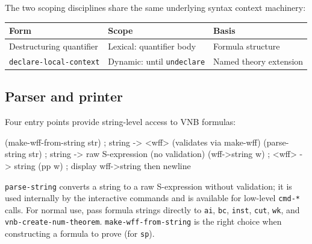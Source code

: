 \documentclass{amsbook}[openany]
\theoremstyle{definition}
\theoremstyle{remark}
\theoremstyle{remark}
\begin{document}
The two scoping disciplines share the same underlying syntax context
machinery:

\begin{center}
\begin{tabular}{lll}
\toprule
Form & Scope & Basis \\
\midrule
Destructuring quantifier &
  Lexical: quantifier body &
  Formula structure \\
\texttt{declare-local-context} &
  Dynamic: until \texttt{undeclare} &
  Named theory extension \\
\bottomrule
\end{tabular}
\end{center}

\subsection{Parser and printer}
\label{sec:parser-printer}

Four entry points provide string-level access to VNB formulas:

\begin{VNBsnip}
(make-wff-from-string str)  ; string -> <wff>  (validates via make-wff)
(parse-string str)          ; string -> raw S-expression (no validation)
(wff->string w)             ; <wff>  -> string
(pp w)                      ; display wff->string then newline
\end{VNBsnip}

\noindent
\texttt{parse-string} converts a string to a raw S-expression without
validation; it is used internally by the interactive commands and is
available for low-level \texttt{cmd-*} calls.  For normal use, pass
formula strings directly to \texttt{ai}, \texttt{bc}, \texttt{inst},
\texttt{cut}, \texttt{wk}, and \texttt{vnb-create-num-theorem}.
\texttt{make-wff-from-string} is the right choice when constructing a
formula to prove (for \texttt{sp}).
\end{document}
